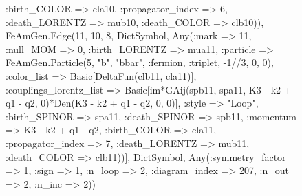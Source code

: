\documentclass{revtex4}
\begin{document}
\begin{figure}[!htb]
\begin{center}
{:birth_COLOR => cla10, :propagator_index => 6, :death_LORENTZ => mub10, :death_COLOR => clb10)), FeAmGen.Edge(11, 10, 8, Dict{Symbol, Any}(:mark => 11, :null_MOM => 0, :birth_LORENTZ => mua11, :particle => FeAmGen.Particle(5, "b", "bbar", :fermion, :triplet, -1//3, 0, 0), :color_list => Basic[DeltaFun(clb11, cla11)], :couplings_lorentz_list => Basic[im*GAij(spb11, spa11, K3 - k2 + q1 - q2, 0)*Den(K3 - k2 + q1 - q2, 0, 0)], :style => "Loop", :birth_SPINOR => spa11, :death_SPINOR => spb11, :momentum => K3 - k2 + q1 - q2, :birth_COLOR => cla11, :propagator_index => 7, :death_LORENTZ => mub11, :death_COLOR => clb11))], Dict{Symbol, Any}(:symmetry_factor => 1, :sign => 1, :n_loop => 2, :diagram_index => 207, :n_out => 2, :n_inc => 2)) 
}
\end{center}
\end{figure}
\end{document}
